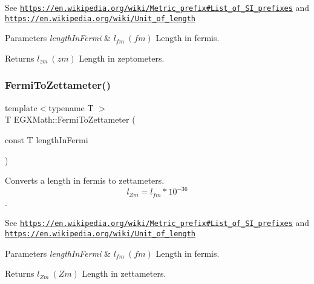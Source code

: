 See \href{https://en.wikipedia.org/wiki/Metric_prefix#List_of_SI_prefixes}{\tt https\+://en.\+wikipedia.\+org/wiki/\+Metric\+\_\+prefix\#\+List\+\_\+of\+\_\+\+S\+I\+\_\+prefixes} and \href{https://en.wikipedia.org/wiki/Unit_of_length}{\tt https\+://en.\+wikipedia.\+org/wiki/\+Unit\+\_\+of\+\_\+length} 
\begin{DoxyParams}{Parameters}
{\em length\+In\+Fermi} & $ l_{fm}\ (fm)$ Length in fermis. \\
\hline
\end{DoxyParams}
\begin{DoxyReturn}{Returns}
$ l_{zm}\ (zm)$ Length in zeptometers. 
\end{DoxyReturn}
\mbox{\label{group___e_g_x_math-_conversions-_length_conversions-_non-_s_i-_fermi-_s_i_ga2ca47f79138a4edf88f4ffa2849ca35d}} 
\subsubsection{\texorpdfstring{Fermi\+To\+Zettameter()}{FermiToZettameter()}}
{\footnotesize\ttfamily template$<$typename T $>$ \\
T E\+G\+X\+Math\+::\+Fermi\+To\+Zettameter (\begin{DoxyParamCaption}\item[{const T}]{length\+In\+Fermi }\end{DoxyParamCaption})}



Converts a length in fermis to zettameters. \[ l_{Zm}=l_{fm} * 10^{-36} \]. 

See \href{https://en.wikipedia.org/wiki/Metric_prefix#List_of_SI_prefixes}{\tt https\+://en.\+wikipedia.\+org/wiki/\+Metric\+\_\+prefix\#\+List\+\_\+of\+\_\+\+S\+I\+\_\+prefixes} and \href{https://en.wikipedia.org/wiki/Unit_of_length}{\tt https\+://en.\+wikipedia.\+org/wiki/\+Unit\+\_\+of\+\_\+length} 
\begin{DoxyParams}{Parameters}
{\em length\+In\+Fermi} & $ l_{fm}\ (fm)$ Length in fermis. \\
\hline
\end{DoxyParams}
\begin{DoxyReturn}{Returns}
$ l_{Zm}\ (Zm)$ Length in zettameters. 
\end{DoxyReturn}
